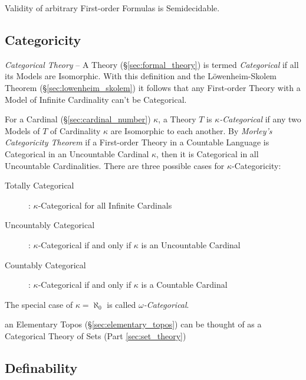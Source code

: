 Validity of arbitrary First-order Formulas is Semidecidable.



\subsection{Categoricity}\label{sec:categoricity}

\emph{Categorical Theory} -- A Theory (\S\ref{sec:formal_theory}) is termed
\emph{Categorical} if all its Models are Isomorphic. With this definition and
the L\"owenheim-Skolem Theorem (\S\ref{sec:lowenheim_skolem}) it follows that
any First-order Theory with a Model of Infinite Cardinality can't be
Categorical.

For a Cardinal (\S\ref{sec:cardinal_number}) $\kappa$, a Theory $T$ is
\emph{$\kappa$-Categorical} if any two Models of $T$ of Cardinality
$\kappa$ are Isomorphic to each another. By \emph{Morley's
  Categoricity Theorem}\cite{morley65} if a First-order Theory in a
Countable Language is Categorical in an Uncountable Cardinal $\kappa$,
then it is Categorical in all Uncountable Cardinalities. There are
three possible cases for $\kappa$-Categoricity:
\begin{description}
\item[Totally Categorical]: $\kappa$-Categorical for all Infinite
  Cardinals
\item[Uncountably Categorical]: $\kappa$-Categorical if and only if
  $\kappa$ is an Uncountable Cardinal
\item[Countably Categorical]: $\kappa$-Categorical if and only if
  $\kappa$ is a Countable Cardinal
\end{description}
The special case of $\kappa = \aleph_0$ is called
\emph{$\omega$-Categorical}.

an Elementary Topos (\S\ref{sec:elementary_topos}) can be thought of as a
Categorical Theory of Sets (Part \ref{sec:set_theory})



\subsection{Definability}\label{sec:definability}


